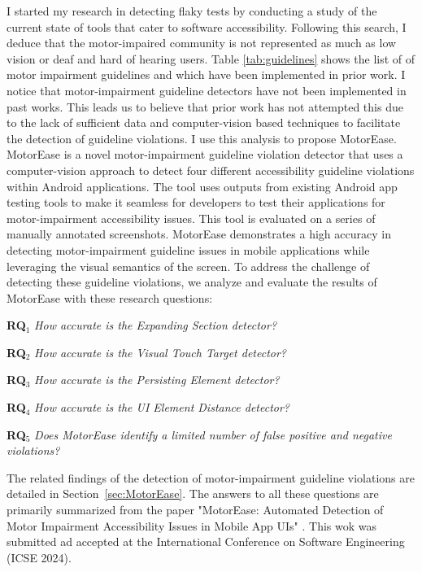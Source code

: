 I started my research in detecting flaky tests by conducting a study of the current state of tools that cater to software accessibility.
Following this search, I deduce that the motor-impaired community is not represented as much as low vision or deaf and hard of hearing users. Table \ref{tab:guidelines} shows the list of of motor impairment guidelines and which have been implemented in prior work. I notice that motor-impairment guideline detectors have not been implemented in past works. This leads us to believe that prior work has not attempted this due to the lack of sufficient data and computer-vision based techniques to facilitate the detection of guideline violations. 
I use this analysis to propose MotorEase. MotorEase is a novel motor-impairment guideline violation detector that uses a computer-vision approach to detect four different accessibility guideline violations within Android applications. The tool uses outputs from existing Android app testing tools to make it seamless for developers to test their applications for motor-impairment accessibility issues. This tool is evaluated on a series of manually annotated screenshots. MotorEase demonstrates a high accuracy in detecting motor-impairment guideline issues in mobile applications while leveraging the visual semantics of the screen. 
To address the challenge of detecting these guideline violations, we analyze and evaluate the results of MotorEase with these research questions: 


\begin{description}
		\item{\textbf{RQ$_1$} \textit{How accurate is the Expanding Section detector?}}
		\item{\textbf{RQ$_2$} \textit{How accurate is the Visual Touch Target detector?}}
        \item{\textbf{RQ$_3$} \textit{How accurate is the Persisting Element detector?}}
        \item{\textbf{RQ$_4$} \textit{How accurate is the UI Element Distance detector?}}
		\item{\textbf{RQ$_5$} \textit{Does MotorEase identify a limited number of false positive and negative violations?}}
\end{description}

The related findings of the detection of motor-impairment guideline violations are detailed in Section~\ref{sec:MotorEase}. The answers to all these questions are primarily summarized from the paper "MotorEase: Automated Detection of Motor Impairment Accessibility Issues in Mobile App UIs" \cite{Krishnavajjala24}. This wok was submitted ad accepted at the International Conference on Software Engineering (ICSE 2024). 




